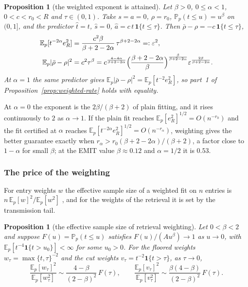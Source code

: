 \documentclass[11pt]{article}
\newtheorem{proposition}[lemma]{Proposition}
\theoremstyle{remark}
\newcommand{\E}{\mathbb{E}}
\newcommand{\Prob}{\mathbb{P}}
\newcommand{\1}{\mathbf{1}}
\begin{document}
\begin{proposition}[the weighted exponent is attained]\label{prop:weighted-attained}
Let $\beta>0$, $0\le\alpha<1$, $0<c<r_0<R$ and $\tau\in(0,1)$. Take $s=a=0$, $\rho=r_0$, $\Prob_p(t\le u)=u^\beta$ on
$(0,1]$, and the predictor $\hat t=t$, $\hat s=0$, $\hat a=c\,t\,\1\{t\le\tau\}$. Then $\bar\rho-\rho=-c\,\1\{t\le\tau\}$,
\[
\begin{aligned}
\E_p[t^{-2\alpha}e_R^2]&=\frac{c^2\beta}{\beta+2-2\alpha}\,\tau^{\beta+2-2\alpha}=:\varepsilon^2,\\
\E_p|\bar\rho-\rho|^2&=c^2\tau^\beta
=c^{\frac{4-4\alpha}{\beta+2-2\alpha}}\Bigl(\frac{\beta+2-2\alpha}{\beta}\Bigr)^{\frac{\beta}{\beta+2-2\alpha}}
\varepsilon^{\frac{2\beta}{\beta+2-2\alpha}} .
\end{aligned}
\]
At $\alpha=1$ the same predictor gives $\E_p|\bar\rho-\rho|^2=\E_p[t^{-2}e_R^2]$, so part~1 of
Proposition~\ref{prop:weighted-rate} holds with equality.
\end{proposition}

At $\alpha=0$ the exponent is the $2\beta/(\beta+2)$ of plain fitting, and it rises continuously to $2$ as
$\alpha\to1$. If the plain fit reaches $\E_p[e_R^2]^{1/2}=O(n^{-r_0})$ and the fit certified at $\alpha$ reaches
$\E_p[t^{-2\alpha}e_R^2]^{1/2}=O(n^{-r_\alpha})$, weighting gives the better guarantee exactly when
$r_\alpha>r_0(\beta+2-2\alpha)/(\beta+2)$, a factor close to $1-\alpha$ for small $\beta$; at the EMIT value
$\beta\approx0.12$ and $\alpha=1/2$ it is $0.53$.

\subsubsection{The price of the weighting}\label{sec:price}

For entry weights $w$ the effective sample size of a weighted fit on $n$ entries is $n\,\E_p[w]^2/\E_p[w^2]$
\cite{kish}, and for the weights of the retrieval it is set by the transmission tail.

\begin{proposition}[the effective sample size of retrieval weighting]\label{prop:neff}
Let $0<\beta<2$ and suppose $F(u)=\Prob_p(t\le u)$ satisfies $F(u)/(Au^\beta)\to1$ as $u\to0$, with
$\E_p[t^{-4}\1\{t>u_0\}]<\infty$ for some $u_0>0$. For the floored weights $w_\tau=\max\{t,\tau\}^{-2}$ and the cut
weights $v_\tau=t^{-2}\1\{t>\tau\}$, as $\tau\to0$,
\[
\frac{\E_p[w_\tau]^2}{\E_p[w_\tau^2]}\sim\frac{4-\beta}{(2-\beta)^2}\,F(\tau),\qquad
\frac{\E_p[v_\tau]^2}{\E_p[v_\tau^2]}\sim\frac{\beta(4-\beta)}{(2-\beta)^2}\,F(\tau).
\]
\end{proposition}
\end{document}
